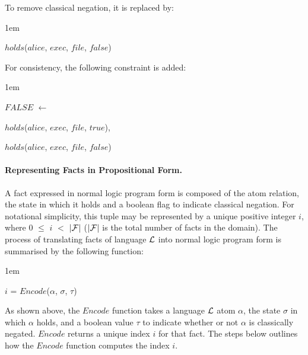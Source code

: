 \documentclass[glov2,twocolumn,final]{svjour2}
\newenvironment{vquote}
  {\begin{list}{}{\leftmargin 1em}\item[]}
  {\end{list}}
\begin{document}
          \noindent
          To remove classical negation, it is replaced by:

          \begin{vquote}
            $holds$($alice$, $exec$, $file$, $false$)
          \end{vquote}

          \noindent
          For consistency, the following constraint is added:

          \begin{vquote}
            $FALSE$ $\leftarrow$

            \hspace{1em}
            $holds$($alice$, $exec$, $file$, $true$),

            \hspace{1em}
            $holds$($alice$, $exec$, $file$, $false$)
          \end{vquote}

        \paragraph{Representing Facts in Propositional Form.}

          A fact expressed in normal logic program form is composed of the
          atom relation, the state in which it holds and a boolean flag to
          indicate classical negation. For notational simplicity, this tuple
          may be represented by a unique positive integer $i$, where
          $0$ $\leq$ $i$ $<$ $|{\cal F}|$ ($|{\cal F}|$ is the total
          number of facts in the domain). The process of translating facts of
          language ${\cal L}$ into normal logic program form is summarised by
          the following function:

          \begin{vquote}
            $i$ = $Encode$($\alpha$, $\sigma$, $\tau$)
          \end{vquote}

          As shown above, the $Encode$ function takes a language ${\cal L}$
          atom $\alpha$, the state $\sigma$ in which $\alpha$ holds, and a
          boolean value $\tau$ to indicate whether or not $\alpha$ is
          classically negated. $Encode$ returns a unique index $i$ for that
          fact. The steps below outlines how the $Encode$ function computes
          the index $i$.
\end{document}
